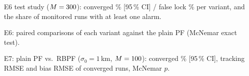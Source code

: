 \begin{table}[H]
  \centering\scriptsize
  \caption{E6 test study ($M = \ESixTestRuns$): converged \% [95\,\% CI] / false lock \% per
    variant, and the share of monitored runs with at least one alarm.}\label{tab:e6}
  \resizebox{\textwidth}{!}{}
\end{table}

\begin{table}[H]
  \centering\small
  \caption{E6: paired comparisons of each variant against the plain PF (McNemar exact
    test).}\label{tab:e6tests}
  
\end{table}

\begin{table}[H]
  \centering\small
  \caption{E7: plain PF vs.\ RBPF ($\sigma_0 = 1$\,km, $M = \ESevenRuns$): converged \%
    [95\,\% CI], tracking RMSE and bias RMSE of converged runs, McNemar $p$.}\label{tab:e7}
  \resizebox{\textwidth}{!}{}
\end{table}
